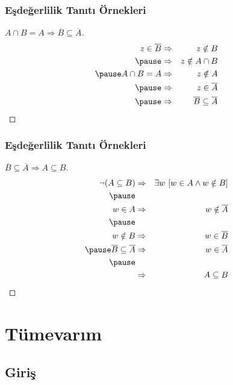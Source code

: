 \documentclass[dvipsnames]{beamer}
\theoremstyle{definition}
\theoremstyle{example}
\theoremstyle{plain}
\begin{document}
\begin{frame}
  \frametitle{Eşdeğerlilik Tanıtı Örnekleri}

  \begin{proof}[$A \cap B = A \Rightarrow \overline{B} \subseteq \overline{A}$]
    \begin{eqnarray*}
      z \in \overline{B} & \Rightarrow & z \notin B\\\pause
                         & \Rightarrow & z \notin A \cap B\\\pause
      A \cap B = A       & \Rightarrow & z \notin A\\\pause
                         & \Rightarrow & z \in \overline{A}\\\pause
                         & \Rightarrow & \overline{B} \subseteq \overline{A}
    \end{eqnarray*}
  \end{proof}
\end{frame}

\begin{frame}
  \frametitle{Eşdeğerlilik Tanıtı Örnekleri}

  \begin{proof}[$\overline{B} \subseteq \overline{A} \Rightarrow A \subseteq B$]
    \begin{eqnarray*}
      \neg (A \subseteq B) & \Rightarrow & \exists w~[w \in A \wedge w \notin B]\\\pause
                 &             &                      \\
      w \in A    & \Rightarrow & w \notin \overline{A}\\\pause
                 &             &                      \\
      w \notin B & \Rightarrow & w \in \overline{B}\\\pause
      \overline{B} \subseteq \overline{A}  & \Rightarrow & w \in \overline{A}\\\pause
                 &             &                      \\
                 & \Rightarrow & A \subseteq B
    \end{eqnarray*}
  \end{proof}
\end{frame}

\section{Tümevarım}

\subsection{Giriş}
\end{document}
